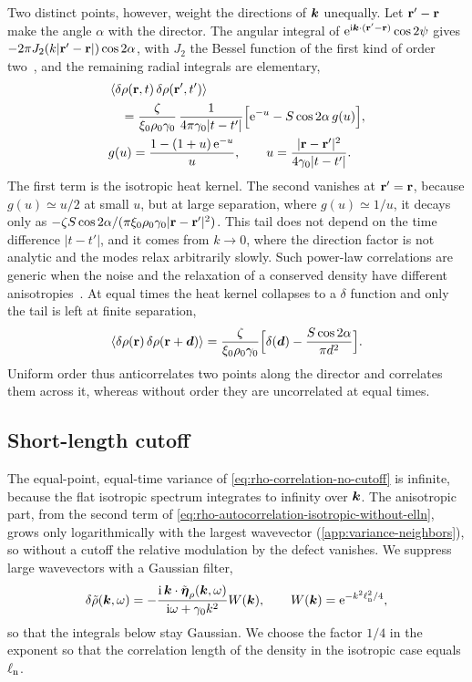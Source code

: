 \documentclass[aps,pre,reprint,superscriptaddress,longbibliography,nofootinbib
]{revtex4-2}
\begin{document}
Two distinct points, however, weight the directions of $\boldsymbol{k}$
unequally. Let $\mathbf{r}'-\mathbf{r}$ make the angle $\alpha$ with the
director. The angular integral of
$\mathrm{e}^{\mathrm{i}\boldsymbol{k}\cdot(\mathbf{r}'-\mathbf{r})}\cos2\psi$ gives $-2\pi
J_2(k|\mathbf{r}'-\mathbf{r}|)\cos2\alpha$, with $J_2$ the Bessel function
of the first kind of order two~\cite{olver2010nist}, and
the remaining radial integrals are elementary,
\begin{align}
  \label{eq:corr-uniform}
  &\left\langle\delta\rho(\mathbf{r},t)\,\delta\rho(\mathbf{r}',t')\right\rangle
  \nonumber\\
  &\quad=\frac{\zeta}{\xi_0\rho_0\gamma_0}\,\frac{1}{4\pi\gamma_0|t-t'|}
  \Bigl[\mathrm{e}^{-u}-S\cos2\alpha\,g(u)\Bigr],
  \nonumber\\
  &g(u)=\frac{1-(1+u)\,\mathrm{e}^{-u}}{u},\qquad u=\frac{|\mathbf{r}-\mathbf{r}'|^2}{4\gamma_0|t-t'|}.
\end{align}
The first term is the isotropic heat kernel. The second
vanishes at $\mathbf{r}'=\mathbf{r}$, because $g(u)\simeq u/2$ at small
$u$, but at large separation, where $g(u)\simeq1/u$, it
decays only as $-\zeta
S\cos2\alpha/(\pi\xi_0\rho_0\gamma_0|\mathbf{r}-\mathbf{r}'|^2)$. This tail
does not depend on the time difference $|t-t'|$, and it
comes from $k\to0$, where the direction factor is not
analytic and the modes relax arbitrarily slowly. Such
power-law correlations are generic when the noise and the
relaxation of a conserved density have different
anisotropies~\cite{grinstein1990conservation,
garrido1990longrange,mahdisoltani2021longrange}. At equal
times the heat kernel collapses to a $\delta$ function and
only the tail is left at finite separation,
\begin{equation}
  \label{eq:corr-uniform-equal-time}
  \left\langle\delta\rho(\mathbf{r})\,\delta\rho(\mathbf{r}+\boldsymbol d)\right\rangle
  =\frac{\zeta}{\xi_0\rho_0\gamma_0}\Bigl[\delta(\boldsymbol d)-\frac{S\cos2\alpha}{\pi d^2}\Bigr].
\end{equation}
Uniform order thus anticorrelates two points along the
director and correlates them across it, whereas without
order they are uncorrelated at equal times.

\subsection{Short-length cutoff}
\label{app:variance-cutoff}

The equal-point, equal-time variance of
\cref{eq:rho-correlation-no-cutoff} is infinite, because
the flat isotropic spectrum integrates to infinity over
$\boldsymbol{k}$. The anisotropic part, from the second term of
\cref{eq:rho-autocorrelation-isotropic-without-elln}, grows
only logarithmically with the largest wavevector
(\cref{app:variance-neighbors}), so without a cutoff the
relative modulation by the defect vanishes. We suppress
large wavevectors with a Gaussian filter,
\begin{equation}
  \delta\tilde\rho(\boldsymbol{k},\omega) =
  -\frac{\mathrm{i}\,\boldsymbol{k}\cdot\tilde {\boldsymbol\eta}_\rho(\boldsymbol{k},\omega)}{\mathrm{i}\omega+\gamma_0 k^2} W(\boldsymbol{k}),
  \qquad W(\boldsymbol{k})=\mathrm{e}^{-k^2\ell_{\rm n}^2/4},
\end{equation}
so that the integrals below stay Gaussian. We choose the
factor $1/4$ in the exponent so that the correlation length
of the density in the isotropic case equals $\ell_{\rm n}$.
\end{document}
